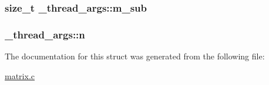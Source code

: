 \hypertarget{struct__thread__args_af7c9422c5325b8766a27b5038c0e9462}{
\subsubsection[{m\-\_\-sub}]{\setlength{\rightskip}{0pt plus 5cm}size\-\_\-t {\bf \-\_\-thread\-\_\-args\-::m\-\_\-sub}}}\label{struct__thread__args_af7c9422c5325b8766a27b5038c0e9462}
\hypertarget{struct__thread__args_a9e0748e3b178eca9ec3f38f7413ce1d6}{
\subsubsection[{n}]{ {\bf \-\_\-thread\-\_\-args\-::n}}}\label{struct__thread__args_a9e0748e3b178eca9ec3f38f7413ce1d6}


\-The documentation for this struct was generated from the following file\-:\begin{DoxyCompactItemize}
\item 
\hyperlink{matrix_8c}{matrix.\-c}\end{DoxyCompactItemize}
